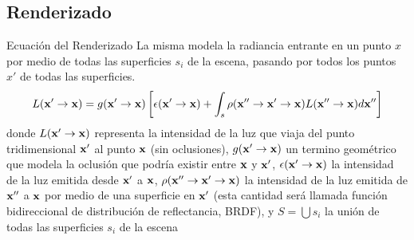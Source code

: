 \documentclass[spanish]{beamer}
\begin{document}
\subsection{Renderizado}


\begin{frame}{Ecuación del Renderizado}
La misma modela la radiancia entrante en un punto $x$ por medio de todas las superficies $s_{i}$ de la escena, pasando por todos los puntos $x'$ de todas las superficies.
\begin{equation*}
L(\bold{x'} \rightarrow \bold{x}) =  g(\bold{x'}  \rightarrow \bold{x})  \left[ \epsilon(\bold{x'}  \rightarrow \bold{x}) + \int_{s}{\rho(\bold{x''}  \rightarrow \bold{x'}  \rightarrow \bold{x})L(\bold{x''}  \rightarrow \bold{x}) d\bold{x''}} \right]
\end{equation*}
donde $L(\bold{x'} \rightarrow \bold{x})$ representa la intensidad de la luz que viaja del punto tridimensional $\bold{x'}$ al punto $\bold{x}$ (sin oclusiones), $g(\bold{x'} \rightarrow \bold{x})$ un termino geométrico que modela la oclusión que podría existir entre $\bold{x}$ y $\bold{x'}$, $\epsilon(\bold{x'} \rightarrow \bold{x})$ la intensidad de la luz emitida desde $\bold{x'}$ a $\bold{x}$, $\rho(\bold{x''}  \rightarrow \bold{x'}  \rightarrow \bold{x})$ la intensidad de la luz emitida de $\bold{x''}$ a $\bold{x}$ por medio de una superficie en $\bold{x'}$ (esta cantidad será llamada función bidireccional de distribución de reflectancia, BRDF), y $S=\bigcup{s_{i}}$ la unión de todas las superficies $s_{i}$ de la escena
\end{frame}
\end{document}
